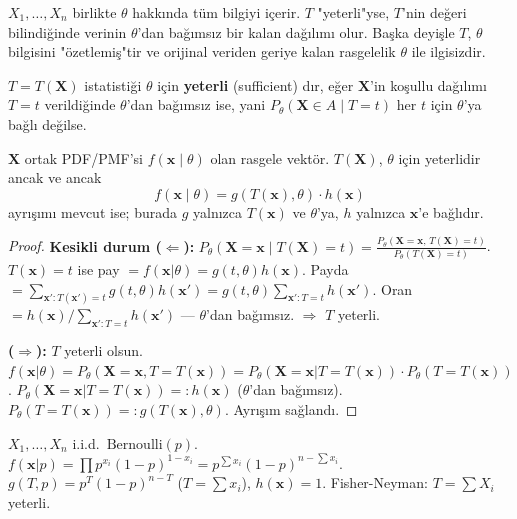 \begin{tanimgerekce}
$X_1,\ldots,X_n$ birlikte $\theta$ hakkında tüm bilgiyi içerir.
$T$ "yeterli"yse, $T$'nin değeri bilindiğinde verinin $\theta$'dan bağımsız bir kalan dağılımı olur.
Başka deyişle $T$, $\theta$ bilgisini "özetlemiş"tir ve orijinal veriden geriye kalan
rasgelelik $\theta$ ile ilgisizdir.
\end{tanimgerekce}

\begin{tanim}
\label{def:yeterli}
$T = T(\mathbf{X})$ istatistiği $\theta$ için \textbf{yeterli} (sufficient) dır, eğer
$\mathbf{X}$'in koşullu dağılımı $T = t$ verildiğinde $\theta$'dan bağımsız ise, yani
$P_\theta(\mathbf{X} \in A \mid T = t)$ her $t$ için $\theta$'ya bağlı değilse.
\end{tanim}

\begin{teorem}
\label{thm:fisher_neyman}
$\mathbf{X}$ ortak PDF/PMF'si $f(\mathbf{x} \mid \theta)$ olan rasgele vektör.
$T(\mathbf{X})$, $\theta$ için yeterlidir ancak ve ancak
\[
  f(\mathbf{x} \mid \theta) = g(T(\mathbf{x}), \theta) \cdot h(\mathbf{x})
\]
ayrışımı mevcut ise; burada $g$ yalnızca $T(\mathbf{x})$ ve $\theta$'ya, $h$ yalnızca $\mathbf{x}$'e bağlıdır.
\end{teorem}

\begin{proof}
\textbf{Kesikli durum ($\Leftarrow$):}
$P_\theta(\mathbf{X}=\mathbf{x} \mid T(\mathbf{X})=t) = \frac{P_\theta(\mathbf{X}=\mathbf{x},\, T(\mathbf{X})=t)}{P_\theta(T(\mathbf{X})=t)}$.
$T(\mathbf{x})=t$ ise pay $= f(\mathbf{x}|\theta) = g(t,\theta)h(\mathbf{x})$.
Payda $= \sum_{\mathbf{x}': T(\mathbf{x}')=t} g(t,\theta)h(\mathbf{x}') = g(t,\theta)\sum_{\mathbf{x}':T=t}h(\mathbf{x}')$.
Oran $= h(\mathbf{x})/\sum_{\mathbf{x}':T=t}h(\mathbf{x}')$ --- $\theta$'dan bağımsız. $\Rightarrow$ $T$ yeterli.

\textbf{($\Rightarrow$):} $T$ yeterli olsun.
$f(\mathbf{x}|\theta) = P_\theta(\mathbf{X}=\mathbf{x}, T=T(\mathbf{x}))
= P_\theta(\mathbf{X}=\mathbf{x}|T=T(\mathbf{x})) \cdot P_\theta(T=T(\mathbf{x}))$.
$P_\theta(\mathbf{X}=\mathbf{x}|T=T(\mathbf{x})) =: h(\mathbf{x})$ ($\theta$'dan bağımsız).
$P_\theta(T=T(\mathbf{x})) =: g(T(\mathbf{x}),\theta)$.
Ayrışım sağlandı.
\end{proof}

\begin{ornek}
$X_1,\ldots,X_n$ i.i.d.\ $\mathrm{Bernoulli}(p)$.
$f(\mathbf{x}|p) = \prod p^{x_i}(1-p)^{1-x_i} = p^{\sum x_i}(1-p)^{n-\sum x_i}$.
$g(T,p) = p^T(1-p)^{n-T}$ ($T = \sum x_i$), $h(\mathbf{x}) = 1$.
Fisher-Neyman: $T = \sum X_i$ yeterli.
\end{ornek}

